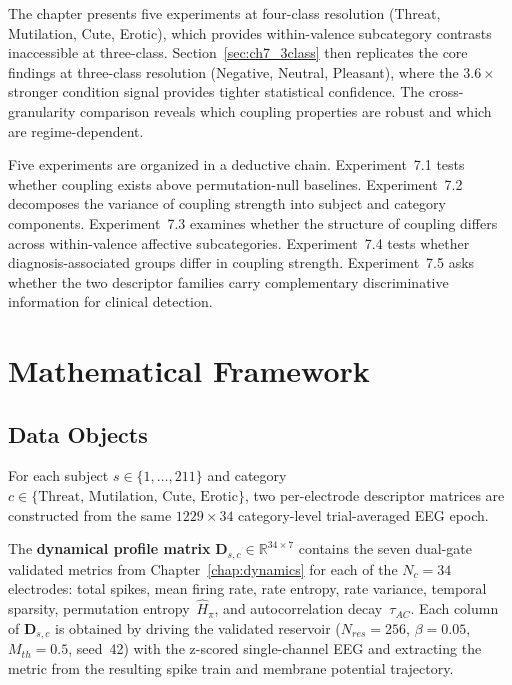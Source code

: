 The chapter presents five experiments at four-class resolution (Threat, Mutilation, Cute, Erotic), which provides within-valence subcategory contrasts inaccessible at three-class. Section~\ref{sec:ch7_3class} then replicates the core findings at three-class resolution (Negative, Neutral, Pleasant), where the $3.6\times$ stronger condition signal provides tighter statistical confidence. The cross-granularity comparison reveals which coupling properties are robust and which are regime-dependent.

Five experiments are organized in a deductive chain. Experiment~7.1 tests whether coupling exists above permutation-null baselines. Experiment~7.2 decomposes the variance of coupling strength into subject and category components. Experiment~7.3 examines whether the structure of coupling differs across within-valence affective subcategories. Experiment~7.4 tests whether diagnosis-associated groups differ in coupling strength. Experiment~7.5 asks whether the two descriptor families carry complementary discriminative information for clinical detection.


\section{Mathematical Framework}
\label{sec:ch7_framework}

\subsection{Data Objects}

For each subject $s \in \{1,\ldots,211\}$ and category $c \in \{\text{Threat, Mutilation, Cute, Erotic}\}$, two per-electrode descriptor matrices are constructed from the same $1229 \times 34$ category-level trial-averaged EEG epoch.

The \textbf{dynamical profile matrix} $\mathbf{D}_{s,c} \in \mathbb{R}^{34 \times 7}$ contains the seven dual-gate validated metrics from Chapter~\ref{chap:dynamics} for each of the $N_c = 34$ electrodes: total spikes, mean firing rate, rate entropy, rate variance, temporal sparsity, permutation entropy~$\hat{H}_\pi$, and autocorrelation decay~$\tau_{AC}$. Each column of $\mathbf{D}_{s,c}$ is obtained by driving the validated reservoir ($N_{res}=256$, $\beta=0.05$, $M_{th}=0.5$, seed~42) with the z-scored single-channel EEG and extracting the metric from the resulting spike train and membrane potential trajectory.

